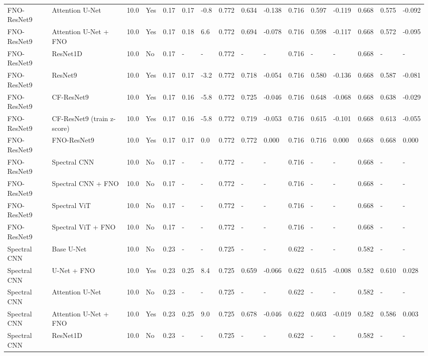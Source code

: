 \begin{longtable}{llllllllllllllll}
FNO-ResNet9 & Attention U-Net & 10.0 & Yes & 0.17 & 0.17 & -0.8 & 0.772 & 0.634 & -0.138 & 0.716 & 0.597 & -0.119 & 0.668 & 0.575 & -0.092 \\
FNO-ResNet9 & Attention U-Net + FNO & 10.0 & Yes & 0.17 & 0.18 & 6.6 & 0.772 & 0.694 & -0.078 & 0.716 & 0.598 & -0.117 & 0.668 & 0.572 & -0.095 \\
FNO-ResNet9 & ResNet1D & 10.0 & No & 0.17 & - & - & 0.772 & - & - & 0.716 & - & - & 0.668 & - & - \\
FNO-ResNet9 & ResNet9 & 10.0 & Yes & 0.17 & 0.17 & -3.2 & 0.772 & 0.718 & -0.054 & 0.716 & 0.580 & -0.136 & 0.668 & 0.587 & -0.081 \\
FNO-ResNet9 & CF-ResNet9 & 10.0 & Yes & 0.17 & 0.16 & -5.8 & 0.772 & 0.725 & -0.046 & 0.716 & 0.648 & -0.068 & 0.668 & 0.638 & -0.029 \\
FNO-ResNet9 & CF-ResNet9 (train z-score) & 10.0 & Yes & 0.17 & 0.16 & -5.8 & 0.772 & 0.719 & -0.053 & 0.716 & 0.615 & -0.101 & 0.668 & 0.613 & -0.055 \\
FNO-ResNet9 & FNO-ResNet9 & 10.0 & Yes & 0.17 & 0.17 & 0.0 & 0.772 & 0.772 & 0.000 & 0.716 & 0.716 & 0.000 & 0.668 & 0.668 & 0.000 \\
FNO-ResNet9 & Spectral CNN & 10.0 & No & 0.17 & - & - & 0.772 & - & - & 0.716 & - & - & 0.668 & - & - \\
FNO-ResNet9 & Spectral CNN + FNO & 10.0 & No & 0.17 & - & - & 0.772 & - & - & 0.716 & - & - & 0.668 & - & - \\
FNO-ResNet9 & Spectral ViT & 10.0 & No & 0.17 & - & - & 0.772 & - & - & 0.716 & - & - & 0.668 & - & - \\
FNO-ResNet9 & Spectral ViT + FNO & 10.0 & No & 0.17 & - & - & 0.772 & - & - & 0.716 & - & - & 0.668 & - & - \\
Spectral CNN & Base U-Net & 10.0 & No & 0.23 & - & - & 0.725 & - & - & 0.622 & - & - & 0.582 & - & - \\
Spectral CNN & U-Net + FNO & 10.0 & Yes & 0.23 & 0.25 & 8.4 & 0.725 & 0.659 & -0.066 & 0.622 & 0.615 & -0.008 & 0.582 & 0.610 & 0.028 \\
Spectral CNN & Attention U-Net & 10.0 & No & 0.23 & - & - & 0.725 & - & - & 0.622 & - & - & 0.582 & - & - \\
Spectral CNN & Attention U-Net + FNO & 10.0 & Yes & 0.23 & 0.25 & 9.0 & 0.725 & 0.678 & -0.046 & 0.622 & 0.603 & -0.019 & 0.582 & 0.586 & 0.003 \\
Spectral CNN & ResNet1D & 10.0 & No & 0.23 & - & - & 0.725 & - & - & 0.622 & - & - & 0.582 & - & - \\

\end{longtable}
